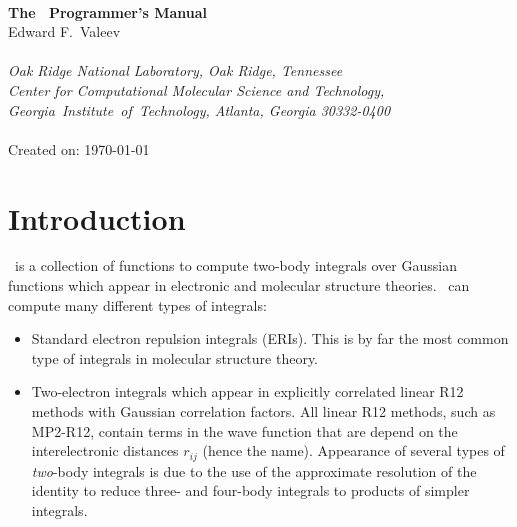 \documentclass[12pt]{article}
\begin{document}


\begin{center}
\ \\
\vspace{2.0in}
{\bf {\Large The \LIBINT\ Programmer's Manual}} \\
\vspace{0.5in}
Edward F.\ Valeev \\
\ \\
{\em Oak Ridge National Laboratory, Oak Ridge, Tennessee}\\
\vspace{0.1in}
{\em Center for Computational Molecular Science and Technology, \mbox{Georgia
Institute of Technology,} Atlanta, Georgia 30332-0400}
\ \\
\vspace{0.3in}
\LIBINTv \\
Created on: \today
\end{center}

\thispagestyle{empty}

\newpage
\section{Introduction}
\LIBINT\ is a collection of functions to compute two-body integrals over Gaussian
functions which appear in electronic and molecular structure theories.
\LIBINTv \cite{Libint1}\ can compute many different types of integrals:

\begin{itemize}

\item Standard electron repulsion integrals (ERIs). This is by far the most common type of
integrals in molecular structure theory.

\item Two-electron integrals which appear in explicitly correlated linear R12 methods
with Gaussian correlation factors.\cite{Kutzelnigg85,Kutzelnigg91,Persson96} All linear R12 methods, such as
MP2-R12, contain terms in the wave function that are depend on the interelectronic distances
$r_{ij}$ (hence the name). Appearance of several types of {\em two}-body integrals
is due to the use of the approximate resolution of the identity to reduce three- and four-body
integrals to products of simpler integrals.

\end{itemize}
\end{document}
